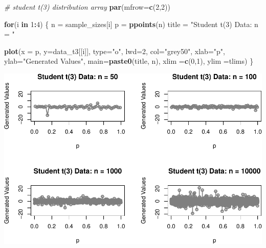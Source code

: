 \documentclass[9pt,letter]{article}
\newenvironment{Shaded}{\begin{snugshade}}{\end{snugshade}}
\newcommand{\KeywordTok}[1]{\textcolor[rgb]{0.13,0.29,0.53}{\textbf{#1}}}
\newcommand{\DataTypeTok}[1]{\textcolor[rgb]{0.13,0.29,0.53}{#1}}
\newcommand{\DecValTok}[1]{\textcolor[rgb]{0.00,0.00,0.81}{#1}}
\newcommand{\StringTok}[1]{\textcolor[rgb]{0.31,0.60,0.02}{#1}}
\newcommand{\CommentTok}[1]{\textcolor[rgb]{0.56,0.35,0.01}{\textit{#1}}}
\newcommand{\ControlFlowTok}[1]{\textcolor[rgb]{0.13,0.29,0.53}{\textbf{#1}}}
\newcommand{\OperatorTok}[1]{\textcolor[rgb]{0.81,0.36,0.00}{\textbf{#1}}}
\newcommand{\NormalTok}[1]{#1}
\begin{document}
\begin{Shaded}
\begin{Highlighting}[]
\CommentTok{# student t(3) distribution array}
\KeywordTok{par}\NormalTok{(}\DataTypeTok{mfrow=}\KeywordTok{c}\NormalTok{(}\DecValTok{2}\NormalTok{,}\DecValTok{2}\NormalTok{))}

\ControlFlowTok{for}\NormalTok{(i }\ControlFlowTok{in} \DecValTok{1}\OperatorTok{:}\DecValTok{4}\NormalTok{) \{}
\NormalTok{  n =}\StringTok{ }\NormalTok{sample_sizes[i]}
\NormalTok{  p =}\StringTok{ }\KeywordTok{ppoints}\NormalTok{(n)}
\NormalTok{  title =}\StringTok{ "Student t(3) Data: n = "}
  
  \KeywordTok{plot}\NormalTok{(}\DataTypeTok{x =}\NormalTok{ p, }\DataTypeTok{y=}\NormalTok{data_t3[[i]], }
      \DataTypeTok{type=}\StringTok{"o"}\NormalTok{, }\DataTypeTok{lwd=}\DecValTok{2}\NormalTok{, }\DataTypeTok{col=}\StringTok{"grey50"}\NormalTok{,}
      \DataTypeTok{xlab=}\StringTok{"p"}\NormalTok{, }\DataTypeTok{ylab=}\StringTok{"Generated Values"}\NormalTok{,}
      \DataTypeTok{main=}\KeywordTok{paste0}\NormalTok{(title, n),}
      \DataTypeTok{xlim =}\KeywordTok{c}\NormalTok{(}\DecValTok{0}\NormalTok{,}\DecValTok{1}\NormalTok{), }\DataTypeTok{ylim =}\NormalTok{tlims)}
\NormalTok{\}}
\end{Highlighting}
\end{Shaded}

\includegraphics{a3_solutions_files/figure-latex/unnamed-chunk-7-2.pdf}
\end{document}
